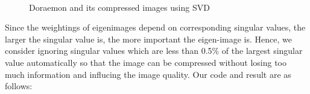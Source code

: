\documentclass[12pt]{article}
\begin{document}
\begin{figure}[H]
    \centering
    \\
    \caption{Doraemon and its compressed images using SVD}
    \label{ref_label_overall}
\end{figure}
\begin{flushleft}
Since the weightings of eigenimages depend on corresponding singular values, the larger the singular value is,
the more important the eigen-image is. Hence, we consider ignoring singular values which are less than 0.5\% of the 
largest singular value automatically so that the image can be compressed without losing too much information and influcing
the image quality. Our code and result are as follows:\\
\end{flushleft}
\end{document}
